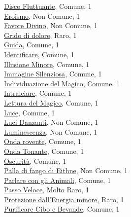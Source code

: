 \begin{multicols}{3}
{{\hyperlink{Disco Fluttuante}{Disco Fluttuante}, Comune, 1\\
\hyperlink{Eroismo}{Eroismo}, Non Comune, 1\\
\hyperlink{Favore Divino}{Favore Divino}, Non Comune, 1\\
\hyperlink{Grido di dolore}{Grido di dolore}, Raro, 1\\
\hyperlink{Guida}{Guida}, Comune, 1\\
\hyperlink{Identificare}{Identificare}, Comune, 1\\
\hyperlink{Illusione Minore}{Illusione Minore}, Comune, 1\\
\hyperlink{Immagine Silenziosa}{Immagine Silenziosa}, Comune, 1\\
\hyperlink{Individuazione del Magico}{Individuazione del Magico}, Comune, 1\\
\hyperlink{Intralciare}{Intralciare}, Comune, 1\\
\hyperlink{Lettura del Magico}{Lettura del Magico}, Comune, 1\\
\hyperlink{Luce}{Luce}, Comune, 1\\
\hyperlink{Luci Danzanti}{Luci Danzanti}, Non Comune, 1\\
\hyperlink{Luminescenza}{Luminescenza}, Non Comune, 1\\
\hyperlink{Onda rovente}{Onda rovente}, Comune, 1\\
\hyperlink{Onda Tonante}{Onda Tonante}, Comune, 1\\
\hyperlink{Oscurità}{Oscurità}, Comune, 1\\
\hyperlink{Palla di fango di Eithne}{Palla di fango di Eithne}, Non Comune, 1\\
\hyperlink{Parlare con gli Animali}{Parlare con gli Animali}, Comune, 1\\
\hyperlink{Passo Veloce}{Passo Veloce}, Molto Raro, 1\\
\hyperlink{Protezione dall'Energia minore}{Protezione dall'Energia minore}, Raro, 1\\
\hyperlink{Purificare Cibo e Bevande}{Purificare Cibo e Bevande}, Comune, 1\\
}}
\end{multicols}
